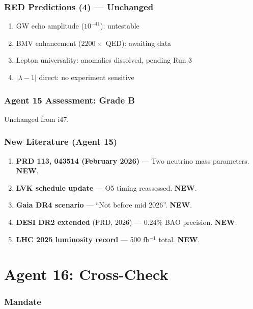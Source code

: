 \documentclass[11pt,a4paper]{article}
\newcommand{\NEW}{\textcolor{dfdblue}{\textbf{NEW}}}
\begin{document}
\section{RED Predictions (4) --- Unchanged}

\begin{enumerate}
\item GW echo amplitude ($10^{-41}$): untestable
\item BMV enhancement ($2200\times$ QED): awaiting data
\item Lepton universality: anomalies dissolved, pending Run 3
\item $|\lambda-1|$ direct: no experiment sensitive
\end{enumerate}

\section{Agent 15 Assessment: Grade B}

Unchanged from i47.

\section{New Literature (Agent 15)}

\begin{enumerate}
\item \textbf{PRD 113, 043514 (February 2026)} --- Two neutrino mass parameters. \NEW.
\item \textbf{LVK schedule update} --- O5 timing reassessed. \NEW.
\item \textbf{Gaia DR4 scenario} --- ``Not before mid 2026''. \NEW.
\item \textbf{DESI DR2 extended} (PRD, 2026) --- 0.24\% BAO precision. \NEW.
\item \textbf{LHC 2025 luminosity record} --- 500 fb$^{-1}$ total. \NEW.
\end{enumerate}


\part{Agent 16: Cross-Check}
\label{part:agent16}

\section{Mandate}
\end{document}
